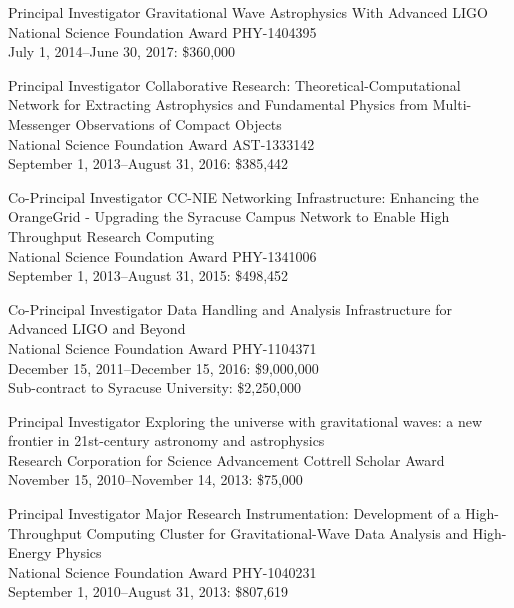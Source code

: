 \documentclass{cv}
\begin{document}
\begin{wideentry}
\item[Principal Investigator]{Gravitational Wave Astrophysics With Advanced LIGO}\\
{\small National Science Foundation Award PHY-1404395\\
July 1, 2014--June 30, 2017: \$360,000}\\

\item[Principal Investigator]{Collaborative Research: Theoretical-Computational Network for Extracting Astrophysics and Fundamental Physics from Multi-Messenger Observations of Compact Objects}\\
{\small National Science Foundation Award AST-1333142\\
September 1, 2013--August 31, 2016: \$385,442}\\

\item[Co-{Principal} Investigator]{CC-NIE Networking Infrastructure: Enhancing the OrangeGrid - Upgrading the Syracuse Campus Network to Enable High Throughput Research Computing}\\
{\small National Science Foundation Award PHY-1341006\\
September 1, 2013--August 31, 2015: \$498,452}\\

\item[Co-{Principal} Investigator]{Data Handling and Analysis Infrastructure for Advanced LIGO and Beyond}\\
{\small National Science Foundation Award PHY-1104371\\
December 15, 2011--December 15, 2016: \$9,000,000\\
Sub-contract to Syracuse University: \$2,250,000}

\item[Principal Investigator]{Exploring the universe with gravitational waves: a new frontier in 21st-century astronomy and astrophysics}\\
{\small Research Corporation for Science Advancement Cottrell Scholar Award\\
November 15, 2010--November 14, 2013: \$75,000}

\item[Principal Investigator]{Major Research Instrumentation:
Development of a High-Throughput Computing Cluster for 
Gravitational-Wave Data Analysis and High-Energy Physics}\\
{\small National Science Foundation Award PHY-1040231\\
September 1, 2010--August 31, 2013: \$807,619}


\end{wideentry}
\end{document}
